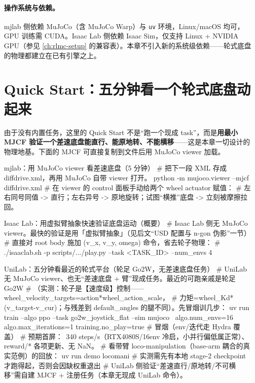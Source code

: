 \paragraph{操作系统与依赖。}mjlab 侧依赖 MuJoCo（含 MuJoCo Warp）与 \verb|uv| 环境，Linux/macOS 均可，GPU 训练需 CUDA。Isaac Lab 侧依赖 Isaac Sim，仅支持 Linux + NVIDIA GPU（参见 \cref{ch:rlmc-setup} 的兼容表）。本章不引入新的系统级依赖——轮式底盘的物理都建立在已有引擎之上。

\section{Quick Start：五分钟看一个轮式底盘动起来}
\label{sec:rlmc-wh-quickstart}

由于没有内置任务，这里的 Quick Start 不是“跑一个现成 task”，而是\textbf{用最小 MJCF 验证一个差速底盘能直行、能原地转、不能横移}——这是本章一切设计的物理地基。下面的 MJCF 可直接复制到文件后用 MuJoCo viewer 加载。

\begin{codebox}[bash]{mjlab：用 MuJoCo viewer 看差速底盘（5 分钟）}
# 把下一段 XML 存成 diffdrive.xml，再用 MuJoCo 自带 viewer 打开。
python -m mujoco.viewer --mjcf diffdrive.xml
# 在 viewer 的 control 面板手动给两个 wheel actuator 赋值：
#   左右同号同值 -> 直行；左右异号 -> 原地旋转；试图“横推”底盘 -> 立刻被摩擦拉回。
\end{codebox}

\begin{codebox}[Python]{Isaac Lab：用虚拟臂抽象快速验证底盘运动（概要）}
# Isaac Lab 侧无 MuJoCo viewer。最快的验证是用「虚拟臂抽象」（见后文“USD 配置与 n-gon 伪影”一节）
# 直接对 root body 施加 (v_x, v_y, omega) 命令，省去轮子物理：
# ./isaaclab.sh -p scripts/.../play.py --task <TASK_ID> --num_envs 4
\end{codebox}

\begin{codebox}[bash]{UniLab：五分钟看最近的轮式平台（轮足 Go2W，无差速底盘任务）}
# UniLab 无 MuJoCo viewer、也无“差速底盘 + 臂”现成任务。最近的可跑亲戚是轮足 Go2W
# （实测：轮子是【速度级】控制——wheel_velocity_targets=action*wheel_action_scale，
#  力矩=wheel_Kd*(v_target-v_cur)；与残差到 default_angles 的腿不同）。先冒烟训几步：
uv run train --algo ppo --task go2w_joystick_flat --sim mujoco \
    algo.num_envs=16 algo.max_iterations=1 training.no_play=true   # 冒烟（env/迭代走 Hydra 覆盖）
# 预期首屏：~340 steps/s（RTX4080S/16env 冷启，小并行偏低属正常）、reward/* 各项更新、无 NaN。
# 看带臂 loco-manipulation（base-arm 耦合的真实范例）的回放：
uv run demo locomani        # 实测需先有本地 stage-2 checkpoint 才跑得起，否则会因缺权重退出
# UniLab 侧验证“差速直行/原地转/不可横移”需自建 MJCF + 注册任务（本章无现成 UniLab 命令）。
\end{codebox}

